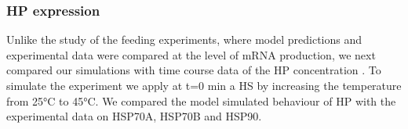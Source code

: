 \documentclass[oneside, 10pt, a4paper, twocolumn]{article}
\begin{document}





\subsubsection{HP expression}
\label{SecTimeCurse}

Unlike the study of the feeding experiments, where model predictions and experimental data 
were compared at the level of mRNA production, we next compared our simulations 
with time course data of the HP concentration \cite{Muehlhaus2011}. 
To simulate the experiment we apply at t=$0$ min a HS by increasing  the temperature from 25°C to 45°C. We compared the model simulated behaviour of HP with the experimental data on HSP70A, HSP70B and HSP90.  
\end{document}
